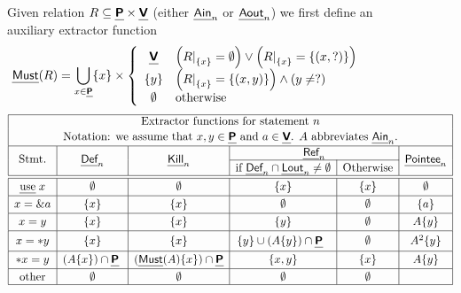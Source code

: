 \documentclass{llncs}
\newcommand{\var}{\text{\sf\bfseries\em V}\xspace}
\newcommand{\pointer}{\text{\sf\bfseries\em P}\xspace}
\newcommand{\pt}[2]{\text{$(#1,#2)$}}
\newcommand{\ain}{\text{{\sf\em Ain\/}}\xspace}
\newcommand{\lout}{\text{{\sf\em Lout\/}}\xspace}
\newcommand{\aout}{\text{{\sf\em Aout\/}}\xspace}
\newcommand{\must}{\text{\sf\em Must\/}\xspace}
\newcommand{\Def}{\text{{\sf\em Def}}\xspace}
\newcommand{\Pointee}{\text{{\sf\em Pointee}}\xspace}
\newcommand{\Kill}{\text{{\sf\em Kill}}\xspace}
\newcommand{\Ref}{\text{{\sf\em Ref}}\xspace} \newcommand{\sRef}{\text{{\sf\em sRef}}\xspace}
\newcommand{\lrestrict}[2]{\text{$\protect#1{\mid}_{\protect#2}$}}
\begin{document}
\begin{figure}[!t]
Given relation $R\subseteq \pointer\times\var$ (either $\ain_n$ or $\aout_n$)
we first define an auxiliary extractor function
\begin{align}
\must(R) & 
	= \bigcup_{x\in \pointer} \{x\} \times
  \left\{\begin{array}{c@{\hspace{1em}}l}
     \var 
	& \left(\lrestrict{R}{\{x\}} = \emptyset \right)\vee
	  \left(\lrestrict{R}{\{x\}} = \{ \pt{x}{?}\}\right)
		\\
     \{y\} 
	& 
	  \left(\lrestrict{R}{\{x\}} = \{ \pt{x}{y}\}\right) \wedge
	  (y \neq ?)
	\\
     \emptyset & \mbox{otherwise}
  \end{array}\right.
	\label{eq:must.new.def}
\end{align}
\[
\begin{array}{|c|c|c|c|c|c|}
\hline
\multicolumn{6}{|c|}{\text{Extractor functions for statement $n$}
}
\\ \multicolumn{6}{|c|}{\text{Notation: we assume that $x, y \in \pointer$ and $a\in \var$.
$A$ abbreviates $\ain_n$.}\rule[-.5em]{0em}{1.5em}
}
\\ \hline
\multirow{2}{*}{Stmt.} 
	& \multirow{2}{*}{$\Def_n$}
	& \multirow{2}{*}{$\Kill_n$}
	& \multicolumn{2}{c|}{\Ref_n}
	& \multirow{2}{*}{$\Pointee_n$}
	\\ \cline{4-5}
	&
	&
	& \text{if } \Def_n \cap \lout_n \neq \emptyset\rule{0em}{1em}
	& \text{Otherwise}
	&
		\\ \hline\hline
\text{\em use\/} \; x
	& \emptyset
	& \emptyset
	& \rule[-.5em]{0em}{1.5em}
	 \{ x\}
	& \rule[-.5em]{0em}{1.5em}
	 \{ x\}
	& \emptyset
		\\ \hline
x = \& a
	& \{ x\}
	& \{ x\}
	& \rule[-.5em]{0em}{1.5em}
	 \emptyset
	& \rule[-.5em]{0em}{1.5em}
	 \emptyset
	& \{ a\}
		\\ \hline
x = y
	& \{ x\}
	& \{ x\}
	& \{y\}  
	& \emptyset
	& \rule[-.5em]{0em}{1.5em}
	 A\{y\} 
		\\ \hline
x = *y 
	& \{ x\}
	& \{ x\}
	& \{ y \} \cup (A\{y\}) \cap \pointer \;\;
	& \emptyset
	& \rule[-.6em]{0em}{1.75em}
		A^2 \{y\}  
		\\ \hline
* x = y 
	& (A\{x\}) \cap \pointer \;
	 \rule[-.5em]{0em}{1.5em}
	& (\must(A)\{x\}) \cap \pointer 
	&  \{ x, y\}
	&  \{ x\}
	& A\{y\}
		\\ \hline
\text{other} \rule[-.25em]{0em}{1.25em}
	& \emptyset
	& \emptyset
	& \emptyset
	& \emptyset
        &
		\\ \hline
\end{array}
\]




\end{figure}
\end{document}
